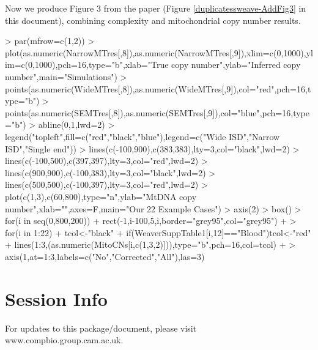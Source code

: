 \documentclass{article}
\begin{document}
Now we produce Figure 3 from the paper (Figure \ref{duplicatessweave-AddFig3} in this document), combining complexity and mitochondrial copy number results.

\begin{Schunk}
\begin{Sinput}
> par(mfrow=c(1,2))
> plot(as.numeric(NarrowMTres[,8]),as.numeric(NarrowMTres[,9]),xlim=c(0,1000),ylim=c(0,1000),pch=16,type="b",xlab="True copy number",ylab="Inferred copy number",main="Simulations")
> points(as.numeric(WideMTres[,8]),as.numeric(WideMTres[,9]),col="red",pch=16,type="b")
> points(as.numeric(SEMTres[,8]),as.numeric(SEMTres[,9]),col="blue",pch=16,type="b")
> abline(0,1,lwd=2)
> legend("topleft",fill=c("red","black","blue"),legend=c("Wide ISD","Narrow ISD","Single end"))
> lines(c(-100,900),c(383,383),lty=3,col="black",lwd=2)
> lines(c(-100,500),c(397,397),lty=3,col="red",lwd=2)
> lines(c(900,900),c(-100,383),lty=3,col="black",lwd=2)
> lines(c(500,500),c(-100,397),lty=3,col="red",lwd=2)
> plot(c(1,3),c(60,800),type="n",ylab="MtDNA copy number",xlab="",axes=F,main="Our 22 Example Cases")
> axis(2)
> box()
> for(i in seq(0,800,200)){
+   rect(-1,i-100,5,i,border="grey95",col="grey95")
+ }
> for(i in 1:22){
+   tcol<-"black"
+   if(WeaverSuppTable1[i,12]=="Blood"){tcol<-"red"}
+   lines(1:3,(as.numeric(MitoCNs[i,c(1,3,2)])),type="b",pch=16,col=tcol)
+ }
> axis(1,at=1:3,labels=c("No\nduplicates\nremoved","Corrected\nestimate","All\nduplicates\nremoved"),las=3)
\end{Sinput}
\end{Schunk}


\clearpage{}

\section{Session Info}

For updates to this package/document, please visit www.compbio.group.cam.ac.uk.
\end{document}
